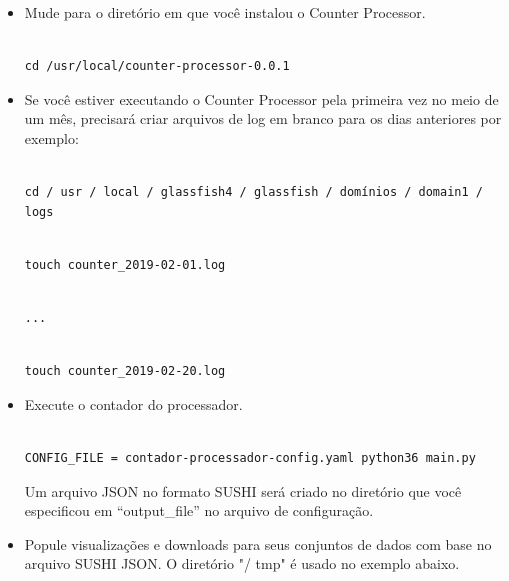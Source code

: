 \documentclass[12pt,hidelinks]{article}
\begin{document}
\begin{itemize}

\item Mude para o diretório em que você instalou o Counter Processor.

\begin{verbatim}

cd /usr/local/counter-processor-0.0.1

\end{verbatim}

\item Se você estiver executando o Counter Processor pela primeira vez no meio de um mês, precisará criar arquivos de log em branco para os dias anteriores por exemplo:

\begin{verbatim}

cd / usr / local / glassfish4 / glassfish / domínios / domain1 / logs

\end{verbatim}

\begin{verbatim}

touch counter_2019-02-01.log

\end{verbatim}

\begin{verbatim}

...

\end{verbatim}

\begin{verbatim}

touch counter_2019-02-20.log

\end{verbatim}

\item Execute o contador do processador.

\begin{verbatim}

CONFIG_FILE = contador-processador-config.yaml python36 main.py

\end{verbatim}

Um arquivo JSON no formato SUSHI será criado no diretório que você especificou em “output\_file” no arquivo de configuração.

\item Popule visualizações e downloads para seus conjuntos de dados com base no arquivo SUSHI JSON. O diretório "/ tmp" é usado no exemplo abaixo.


\end{itemize}
\end{document}
